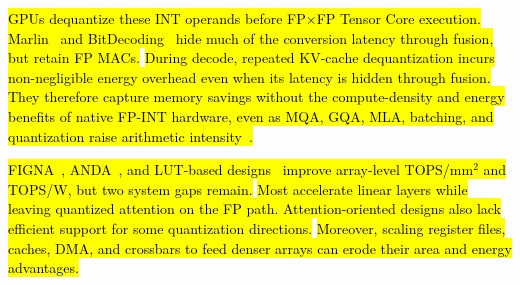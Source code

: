 \documentclass[sigconf,anonymous,nonacm]{acmart}
\newcommand{\fpint}{FP-INT}
\DeclareRobustCommand{\rev}[1]{\hl{#1}}
\begin{document}



\rev{GPUs dequantize these INT operands before FP$\times$FP Tensor Core execution.} \rev{Marlin~\cite{marlin} and BitDecoding~\cite{bitdecoding} hide much of the conversion latency through fusion, but retain FP MACs.} \rev{During decode, repeated KV-cache dequantization incurs non-negligible energy overhead even when its latency is hidden through fusion.} \rev{They therefore capture memory savings without the compute-density and energy benefits of native \fpint{} hardware, even as MQA, GQA, MLA, batching, and quantization raise arithmetic intensity~\cite{mqa,gqa,deepseekai2024deepseekv2strongeconomicalefficient}.}

\rev{FIGNA~\cite{figna}, ANDA~\cite{anda}, and LUT-based designs~\cite{figlut,lut_tensor_core} improve array-level TOPS/mm$^2$ and TOPS/W, but two system gaps remain.} \rev{Most accelerate linear layers while leaving quantized attention on the FP path. Attention-oriented designs also lack efficient support for some quantization directions.} \rev{Moreover, scaling register files, caches, DMA, and crossbars to feed denser arrays can erode their area and energy advantages.}
\end{document}
